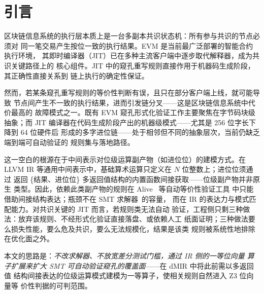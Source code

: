 \section{引言}

区块链信息系统的执行层本质上是一台多副本共识状态机：所有参与共识的节点必须对
同一笔交易产生按位一致的执行结果。EVM 是当前最广泛部署的智能合约执行环境，
其即时编译器（JIT）已在多种主流客户端中逐步取代解释器，成为共识关键路径上的
核心组件。JIT 中的窥孔重写规则直接作用于机器码生成阶段，其正确性直接关系到
链上执行的确定性保证。

然而，若某条窥孔重写规则的等价性判断有误，且只在部分客户端上线，就可能导致
节点间产生不一致的执行结果，进而引发链分叉——这是区块链信息系统中代价最高的
故障模式之一。既有 EVM 窥孔形式化验证工作主要聚焦在字节码块级抽象；而 JIT
编译器在代码生成阶段产出的机器级模式——尤其是 256 位字长下降到 64 位硬件后
形成的多字进位链——处于相邻但不同的抽象层次，当前仍缺乏端到端可自动验证的
规则集与落地路径。

这一空白的根源在于中间表示对位级运算副产物（如进位位）的建模方式。在
LLVM IR 等通用中间表示中，基础算术运算只定义在 $N$ 位整数上；进位位须通过
返回 \{结果、进位位\} 多返回值结构的内置函数间接获取——位级副产物并非原生
类型。因此，依赖此类副产物的规则在 Alive~\cite{alive} 等自动等价性验证工具
中只能借助间接结构表达；瓶颈不在 SMT 求解器~\cite{demoura2008z3}的容量，
而在 IR 的表达力与模式匹配能力。对共识关键的 JIT 而言，若规则类无法自动
验证，工程侧只剩三种做法：放弃该规则、不经形式化验证直接落盘、或依赖人工
纸面证明；三种做法要么损失性能，要么危及共识，要么无法规模化，结果是该类
规则被系统性地排除在优化面之外。

本文的思路是：\emph{不改求解器、不放宽差分测试门槛，通过 IR 侧的一等位向量
算子扩展来扩大 SMT 可自动验证窥孔的覆盖面}——在 dMIR 中将此前需以多返回值
结构间接表达的位级运算模式建模为一等算子，使相关规则自然进入 Z3 位向量等
价性判据的可判范围。

